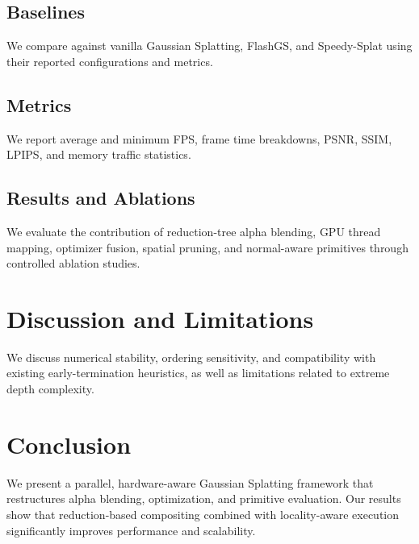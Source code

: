 \documentclass[10pt,twocolumn]{article}
\begin{document}
\subsection{Baselines}
We compare against vanilla Gaussian Splatting, FlashGS, and Speedy-Splat using their reported configurations and metrics.

\subsection{Metrics}
We report average and minimum FPS, frame time breakdowns, PSNR, SSIM, LPIPS, and memory traffic statistics.

\subsection{Results and Ablations}
We evaluate the contribution of reduction-tree alpha blending, GPU thread mapping, optimizer fusion, spatial pruning, and normal-aware primitives through controlled ablation studies.

\section{Discussion and Limitations}
We discuss numerical stability, ordering sensitivity, and compatibility with existing early-termination heuristics, as well as limitations related to extreme depth complexity.

\section{Conclusion}
We present a parallel, hardware-aware Gaussian Splatting framework that restructures alpha blending, optimization, and primitive evaluation. Our results show that reduction-based compositing combined with locality-aware execution significantly improves performance and scalability.



\end{document}
